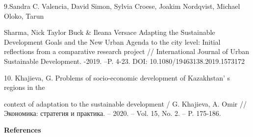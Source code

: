 \begin{noparindent}
9.Sandra C. Valencia, David Simon, Sylvia Croese, Joakim Nordqvist,
Michael Oloko, Tarun

Sharma, Nick Taylor Buck \& Ileana Versace Adapting the Sustainable
Development Goals and the New Urban Agenda to the city level: Initial
reflections from a comparative research project // International Journal
of Urban Sustainable Development. -2019. --P. 4-23. DOI:
10.1080/19463138.2019.1573172

10. Khajieva, G. Problems of socio-economic development of
Kazakhstan' s regions in the

context of adaptation to the sustainable development / G. Khajieva, A.
Omir // Экономика: стратегия и практика. -- 2020. -- Vol. 15, No. 2. --
P. 175-186.
\end{noparindent}

\begin{center}
{\bfseries References}
\end{center}

